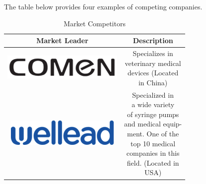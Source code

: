 \documentclass[journal]{IEEEtran}
\begin{document}
            The table below provides four examples of competing companies.
            
            \begin{table}[H]
                \renewcommand{\arraystretch}{1.3}
                \caption{Market Competitors}
                \label{table:Mark_compet}
                \begin{center}
                    \begin{tabular}{|c|c|}
                        \hline
                        \bfseries Market Leader&
                        \bfseries Description\\
                        \hline
                        

                        \includegraphics[scale=0.5]{comen}
                        \cite{goog_device}&
                        \makecell[l]{Specializes in\\
                                     veterinary medical\\
                                     devices (Located\\
                                     in China)}\\
                        \hline
                        
                        \includegraphics[scale=0.5]{wellead}
                        \cite{goog_device}&
                        \makecell[l]{Specialized in\\
                                     a wide variety \\
                                     of syringe pumps\\
                                     and medical equip-\\
                                     ment. One of the \\
                                     top 10 medical \\
                                     companies in this\\
                                     field. (Located in\\
                                     USA)}\\
                        \hline
                        

\end{tabular}
\end{center}
\end{table}
\end{document}

